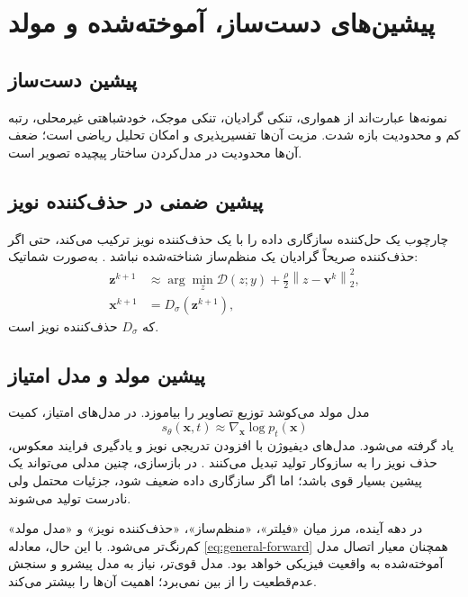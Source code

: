 \documentclass[12pt,openany,oneside]{book}
\newcommand{\norm}[1]{\left\lVert #1\right\rVert}
\newcommand{\vect}[1]{\bm{#1}}
\begin{document}
\section{پیشین‌های دست‌ساز، آموخته‌شده و مولد}

\subsection{پیشین دست‌ساز}

نمونه‌ها عبارت‌اند از همواری، تنکی گرادیان، تنکی موجک، خودشباهتی غیرمحلی، رتبه کم و محدودیت بازه شدت.
مزیت آن‌ها تفسیرپذیری و امکان تحلیل ریاضی است؛ ضعف آن‌ها محدودیت در مدل‌کردن ساختار پیچیده تصویر است.

\subsection{پیشین ضمنی در حذف‌کننده نویز}

چارچوب  یک حل‌کننده سازگاری داده را با یک حذف‌کننده نویز ترکیب می‌کند،
حتی اگر حذف‌کننده صریحاً گرادیان یک منظم‌ساز شناخته‌شده نباشد \cite{venkatakrishnan2013pnp}.
به‌صورت شماتیک:
\begin{align}
\vect z^{k+1}&\approx\arg\min_z\mathcal D(z;y)+\frac{\rho}{2}\norm{z-\vect v^k}_2^2,\\
\vect x^{k+1}&=D_\sigma(\vect z^{k+1}),
\end{align}
که \(D_\sigma\) حذف‌کننده نویز است.

\subsection{پیشین مولد و مدل امتیاز}

مدل مولد می‌کوشد توزیع تصاویر را بیاموزد. در مدل‌های امتیاز، کمیت
\begin{equation}
s_\theta(\vect x,t)\approx\nabla_{\vect x}\log p_t(\vect x)
\end{equation}
یاد گرفته می‌شود. مدل‌های دیفیوژن با افزودن تدریجی نویز و یادگیری فرایند معکوس،
حذف نویز را به سازوکار تولید تبدیل می‌کنند \cite{ho2020ddpm}.
در بازسازی، چنین مدلی می‌تواند یک پیشین بسیار قوی باشد؛ اما اگر سازگاری داده ضعیف شود،
جزئیات محتمل ولی نادرست تولید می‌شوند.

\begin{futurebox}
در دهه آینده، مرز میان «فیلتر»، «منظم‌ساز»، «حذف‌کننده نویز» و «مدل مولد» کم‌رنگ‌تر می‌شود.
با این حال، معادله \eqref{eq:general-forward} همچنان معیار اتصال مدل آموخته‌شده به واقعیت فیزیکی خواهد بود.
مدل قوی‌تر، نیاز به مدل پیشرو و سنجش عدم‌قطعیت را از بین نمی‌برد؛ اهمیت آن‌ها را بیشتر می‌کند.
\end{futurebox}
\end{document}
